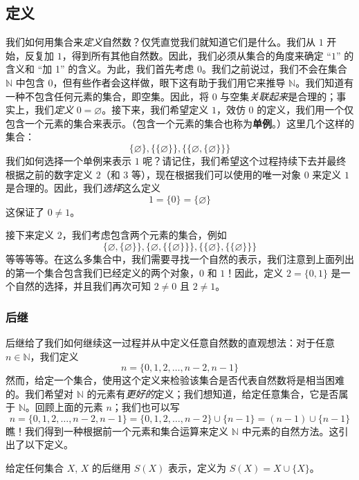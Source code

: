 \subsection{定义}

我们如何用集合来\emph{定义}自然数？仅凭直觉我们就知道它们是什么。我们从 $1$ 开始，反复加 $1$，得到所有其他自然数。因此，我们必须从集合的角度来确定 ``$1$'' 的含义和 ``加 1'' 的含义。为此，我们首先考虑 $0$。我们之前说过，我们不会在集合 $\mathbb{N}$ 中包含 $0$，但有些作者会这样做，眼下这有助于我们用它来推导 $\mathbb{N}$。我们知道有一种不包含任何元素的集合，即空集。因此，将 $0$ 与空集\emph{关联起来}是合理的；事实上，我们\emph{定义} $0 = \varnothing$。接下来，我们希望定义 $1$，效仿 $0$ 的定义，我们用一个仅包含一个元素的集合来表示。（包含一个元素的集合也称为\textbf{单例}。）这里几个这样的集合：
\[\{\varnothing\}, \{\{\varnothing\}\} , \{\{\varnothing, \{\varnothing\}\}\}\]
我们如何选择一个单例来表示 $1$ 呢？请记住，我们希望这个过程持续下去并最终根据之前的数字定义 $2$（和 $3$ 等），现在根据我们可以使用的唯一对象 $0$ 来定义 $1$ 是合理的。因此，我们\emph{选择}这么定义
\[1 = \{0\} = \{\varnothing\}\]
这保证了 $0 \ne 1$。

接下来定义 $2$，我们考虑包含两个元素的集合，例如
\[\{\varnothing, \{\varnothing\}\}, \{\varnothing, \{\{\varnothing\}\}\}, \{\{\varnothing\}, \{\{\varnothing\}\}\}\]
等等等等。在这么多集合中，我们需要寻找一个自然的表示，我们注意到上面列出的第一个集合包含我们已经定义的两个对象，$0$ 和 $1$！因此，定义 $2 = \{0, 1\}$ 是一个自然的选择，并且我们再次可知 $2 \ne 0$ 且 $2 \ne 1$。

\subsubsection*{后继}

后继给了我们如何继续这一过程并从中定义任意自然数的直观想法：对于任意 $n \in \mathbb{N}$，我们定义
\[n = \{0, 1, 2, \dots , n - 2, n - 1\}\]
然而，给定一个集合，使用这个定义来检验该集合是否代表自然数将是相当困难的。我们希望对 $\mathbb{N}$ 的元素有\emph{更好的}定义；我们想知道，给定任意集合，它是否属于 $\mathbb{N}$。回顾上面的元素 $n$；我们也可以写
\[n = \{0, 1, 2, \dots , n - 2, n - 1\} = \{0, 1, 2, \dots , n - 2\} \cup \{n-1\} = (n-1) \cup \{n-1\}\]
瞧！我们得到一种根据前一个元素和集合运算来定义 $\mathbb{N}$ 中元素的自然方法。这引出了以下定义。

\begin{definition}
    给定任何集合 $X$, $X$ 的后继用 $S(X)$ 表示，定义为 $S(X) = X \cup \{X\}$。
\end{definition}

